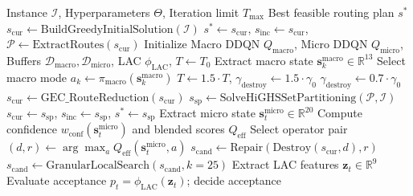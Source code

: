 \documentclass{article}
\begin{document}
\begin{algorithm}[!htbp]
\caption{Full Tri-Level Hybrid DDQN-ALNS for VRPTW}
\label{alg:supp_hybrid_ddqn_alns}
\footnotesize
\begin{algorithmic}[1]
\Require Instance $\mathcal{I}$, Hyperparameters $\Theta$, Iteration limit $T_{\max}$
\Ensure Best feasible routing plan $s^*$
\State $s_{\text{cur}} \leftarrow \text{BuildGreedyInitialSolution}(\mathcal{I})$
\State $s^* \leftarrow s_{\text{cur}}$, $s_{\text{inc}} \leftarrow s_{\text{cur}}$, $\mathcal{P} \leftarrow \text{ExtractRoutes}(s_{\text{cur}})$
\State Initialize Macro DDQN $Q_{\text{macro}}$, Micro DDQN $Q_{\text{micro}}$, Buffers $\mathcal{D}_{\text{macro}}, \mathcal{D}_{\text{micro}}$, LAC $\phi_{\text{LAC}}$, $T \leftarrow T_0$
        \State Extract macro state $\mathbf{s}_k^{\text{macro}} \in \mathbb{R}^{13}$
        \State Select macro mode $a_k \leftarrow \pi_{\text{macro}}(\mathbf{s}_k^{\text{macro}})$
            \State $T \leftarrow 1.5 \cdot T$, $\gamma_{\text{destroy}} \leftarrow 1.5 \cdot \gamma_0$ 
            \State $\gamma_{\text{destroy}} \leftarrow 0.7 \cdot \gamma_0$ 
            \State $s_{\text{cur}} \leftarrow \text{GEC\_RouteReduction}(s_{\text{cur}})$
            \State $s_{\text{sp}} \leftarrow \text{SolveHiGHSSetPartitioning}(\mathcal{P}, \mathcal{I})$
                \State $s_{\text{cur}} \leftarrow s_{\text{sp}}$, $s_{\text{inc}} \leftarrow s_{\text{sp}}$, $s^* \leftarrow s_{\text{sp}}$
            \EndIf
        \EndIf
    \EndIf
    \State Extract micro state $\mathbf{s}_t^{\text{micro}} \in \mathbb{R}^{20}$
    \State Compute confidence $w_{\text{conf}}(\mathbf{s}_t^{\text{micro}})$ and blended scores $Q_{\text{eff}}$
    \State Select operator pair $(d, r) \leftarrow \arg\max_{a} Q_{\text{eff}}(\mathbf{s}_t^{\text{micro}}, a)$
    \State $s_{\text{cand}} \leftarrow \text{Repair}(\text{Destroy}(s_{\text{cur}}, d), r)$
    \State $s_{\text{cand}} \leftarrow \text{GranularLocalSearch}(s_{\text{cand}}, k=25)$
    \State Extract LAC features $\mathbf{z}_t \in \mathbb{R}^9$
    \State Evaluate acceptance $p_t = \phi_{\text{LAC}}(\mathbf{z}_t)$; decide acceptance

\end{algorithmic}
\end{algorithm}
\end{document}
